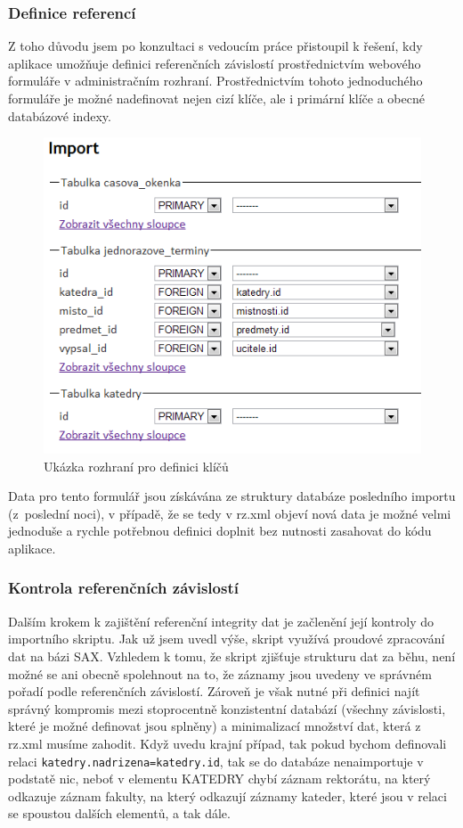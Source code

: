 \documentclass[11pt,twoside,a4paper]{book}
\begin{document}
\subsubsection{Definice referencí} \label{defref}
Z toho důvodu jsem po konzultaci s vedoucím práce přistoupil k řešení, kdy aplikace umožňuje definici referenčních závislostí prostřednictvím webového formuláře v administračním rozhraní. Prostřednictvím tohoto jednoduchého formuláře je možné nadefinovat nejen cizí klíče, ale i primární klíče a obecné databázové indexy.

\begin{figure}[h]
\begin{center}
\includegraphics[scale=0.6]{figures/import_setup.png}
\caption{Ukázka rozhraní pro definici klíčů}
\label{fig:importSetup}
\end{center}
\end{figure}

Data pro tento formulář jsou získávána ze struktury databáze posledního importu (z~poslední noci), v případě, že se tedy v rz.xml objeví nová data je možné velmi jednoduše a rychle potřebnou definici doplnit bez nutnosti zasahovat do kódu aplikace.

\subsubsection{Kontrola referenčních závislostí}
Dalším krokem k zajištění referenční integrity dat je začlenění její kontroly do importního skriptu. Jak už jsem uvedl výše, skript využívá proudové zpracování dat na bázi SAX.
Vzhledem k tomu, že skript zjišťuje strukturu dat za běhu, není možné se ani obecně spolehnout na to, že záznamy jsou uvedeny ve správném pořadí podle referenčních závislostí. Zároveň je však nutné při definici najít správný kompromis mezi stoprocentně konzistentní databází (všechny závislosti, které je možné definovat jsou splněny) a minimalizací množství dat, která z rz.xml musíme zahodit. Když uvedu krajní případ, tak pokud bychom definovali relaci \texttt{katedry.nadrizena=katedry.id}, tak se do databáze nenaimportuje v podstatě nic, neboť v elementu KATEDRY chybí záznam rektorátu, na který odkazuje záznam fakulty, na který odkazují záznamy kateder, které jsou v relaci se spoustou dalších elementů, a tak dále. 
\end{document}

